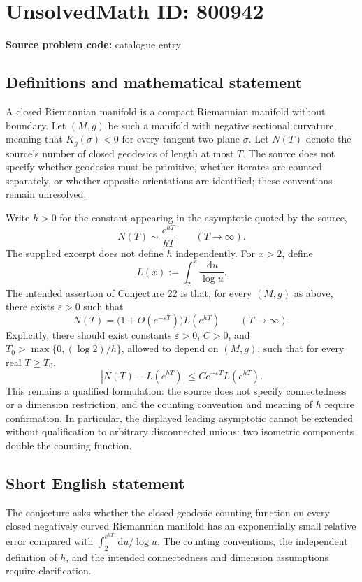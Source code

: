 \documentclass[11pt]{article}
\newcommand{\dd}{\,\mathrm{d}}
\begin{document}
\section*{UnsolvedMath ID: 800942}
\textbf{Source problem code:} catalogue entry
\subsection{Definitions and mathematical statement}
A closed Riemannian manifold is a compact Riemannian manifold without boundary. Let $(M,g)$ be such a manifold with negative sectional curvature, meaning that $K_g(\sigma)<0$ for every tangent two-plane $\sigma$. Let $N(T)$ denote the source's number of closed geodesics of length at most $T$. The source does not specify whether geodesics must be primitive, whether iterates are counted separately, or whether opposite orientations are identified; these conventions remain unresolved.

Write $h>0$ for the constant appearing in the asymptotic quoted by the source,
\[
N(T)\sim \frac{e^{hT}}{hT}\qquad(T\to\infty).
\]
The supplied excerpt does not define $h$ independently. For $x>2$, define
\[
L(x):=\int_2^x\frac{\dd u}{\log u}.
\]
The intended assertion of Conjecture 22 is that, for every $(M,g)$ as above, there exists $\varepsilon>0$ such that
\[
N(T)=\bigl(1+O(e^{-\varepsilon T})\bigr)L(e^{hT})
\qquad(T\to\infty).
\]
Explicitly, there should exist constants $\varepsilon>0$, $C>0$, and $T_0>\max\{0,(\log 2)/h\}$, allowed to depend on $(M,g)$, such that for every real $T\ge T_0$,
\[
\left|N(T)-L(e^{hT})\right|
\le C e^{-\varepsilon T}L(e^{hT}).
\]
This remains a qualified formulation: the source does not specify connectedness or a dimension restriction, and the counting convention and meaning of $h$ require confirmation. In particular, the displayed leading asymptotic cannot be extended without qualification to arbitrary disconnected unions: two isometric components double the counting function.
\subsection{Short English statement}
The conjecture asks whether the closed-geodesic counting function on every closed negatively curved Riemannian manifold has an exponentially small relative error compared with $\int_2^{e^{hT}}\dd u/\log u$. The counting conventions, the independent definition of $h$, and the intended connectedness and dimension assumptions require clarification.
\end{document}

